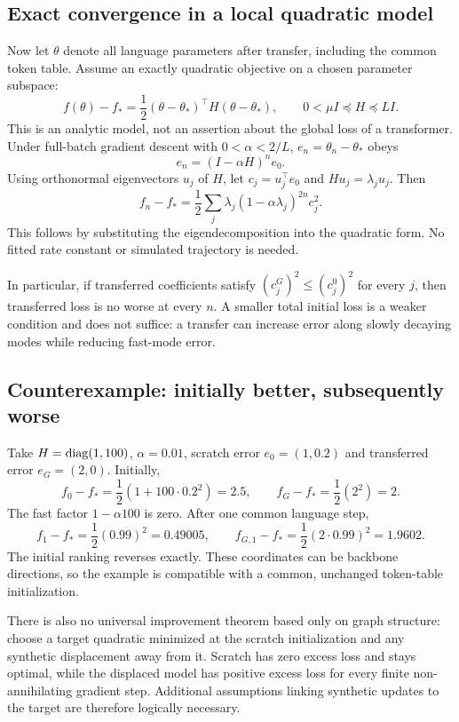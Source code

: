\subsection{Exact convergence in a local quadratic model}

Now let $\theta$ denote all language parameters after transfer, including
the common token table. Assume an exactly quadratic objective on a
chosen parameter subspace:
\begin{equation}
 f(\theta)-f_*=\frac12(\theta-\theta_*)^\top
                   H(\theta-\theta_*),\qquad
 0<\mu I\preceq H\preceq LI.
 \label{eq:quadratic}
\end{equation}
This is an analytic model, not an assertion about the global loss of a
transformer. Under full-batch gradient descent with $0<\alpha<2/L$,
$e_n=\theta_n-\theta_*$ obeys
\begin{equation}
 e_n=(I-\alpha H)^n e_0.
\end{equation}
Using orthonormal eigenvectors $u_j$ of $H$, let
$c_j=u_j^\top e_0$ and $H u_j=\lambda_j u_j$. Then
\begin{equation}
 \boxed{\ f_n-f_*=
   \frac12\sum_j \lambda_j(1-\alpha\lambda_j)^{2n}c_j^2.\ }
 \label{eq:modeformula}
\end{equation}
This follows by substituting the eigendecomposition into the quadratic
form. No fitted rate constant or simulated trajectory is needed.

In particular, if transferred coefficients satisfy
$(c_j^G)^2\leq(c_j^0)^2$ for every $j$, then transferred loss is no worse
at every $n$. A smaller total initial loss is a weaker condition and
does not suffice: a transfer can increase error along slowly decaying
modes while reducing fast-mode error.

\subsection{Counterexample: initially better, subsequently worse}

Take $H=\operatorname{diag}(1,100)$, $\alpha=0.01$, scratch error $e_0=(1,0.2)$ and
transferred error $e_G=(2,0)$. Initially,
\begin{equation}
 f_0-f_*=\frac12(1+100\cdot0.2^2)=2.5,\qquad
 f_G-f_*=\frac12(2^2)=2.
\end{equation}
The fast factor $1-\alpha100$ is zero. After one common language step,
\begin{equation}
 f_1-f_*=\frac12(0.99)^2=0.49005,\qquad
 f_{G,1}-f_*=\frac12(2\cdot0.99)^2=1.9602.
\end{equation}
The initial ranking reverses exactly. These coordinates can be
backbone directions, so the example is compatible with a common,
unchanged token-table initialization.

There is also no universal improvement theorem based only on graph
structure: choose a target quadratic minimized at the scratch
initialization and any synthetic displacement away from it. Scratch
has zero excess loss and stays optimal, while the displaced model has
positive excess loss for every finite non-annihilating gradient step.
Additional assumptions linking synthetic updates to the target are
therefore logically necessary.

